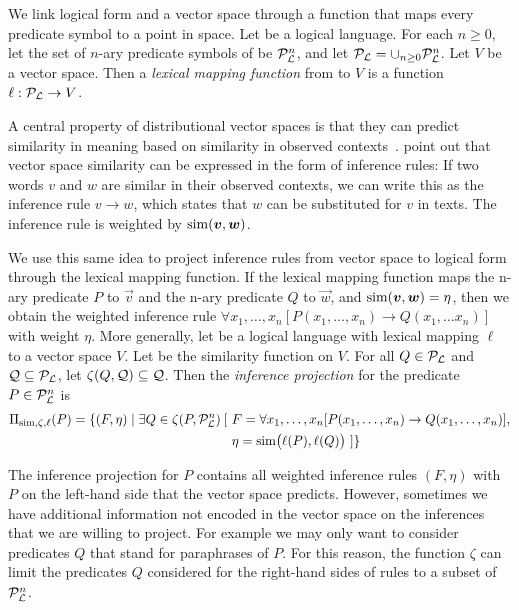 We link logical form and a vector space through a function that maps every predicate symbol to a point in
space. Let \loglang be a logical language. For each $n \ge
0$, let the set of $n$-ary predicate symbols of \loglang be
${\cal{P}}_{{\cal{L}}}^n$, and let ${\cal{P}}_{{\cal{L}}} = \cup_{n \ge 0}
{\cal{P}}_{{\cal{L}}}^n$. Let $V$ be a vector space. Then a \emph{lexical
  mapping function}
from \loglang to $V$ is a function $\ell:
{\cal{P}}_{{\cal{L}}} \to V$.

A central property
of distributional vector spaces is that they can predict similarity in
meaning based on similarity in observed
contexts~\citep{Harris}. \citet{LinPantel:01} point out that
vector space similarity can be expressed in the form of 
inference rules: If two words $v$
and $w$ are similar in their observed contexts, we can write this as
the inference rule $v \to w$, which states that $w$ can be substituted
for $v$ in texts. The inference rule is weighted by $\simfunc(\vec v, \vec w)$. 

We use this same idea to project inference rules from vector space to
logical form through the lexical mapping function. If the lexical mapping
function maps the n-ary predicate $P$ to $\vec
v$ and the n-ary predicate $Q$ to $ \vec w$, and $\simfunc(\vec v, \vec w) = \eta$, then
we obtain the weighted inference rule $\forall x_1,
\ldots, x_n[ P(x_1, \ldots, x_n) \to Q(x_1, \ldots x_n) ]$ with weight
$\eta$. More generally, let \loglang
be a logical language with lexical mapping $\ell$ to a vector space 
$V$. Let \simfunc{} be the similarity function on $V$. For all $Q \in
{\cal{P}}_{{\cal{L}}}$ and ${\cal Q} \subseteq {\cal{P}}_{{\cal{L}}}$, let
$\zeta(Q, {\cal Q}) \subseteq {\cal Q}$. Then the \emph{inference
  projection} for the predicate $P \in {\cal{P}}_{{\cal{L}}}^n$ is 
\begin{align*}
\Pi_{\mathrm{sim}, \zeta, \ell}(P) = \{ (F, \eta) \mid \exists Q \in \zeta(P, {\cal{P}}_{{\cal{L}}}^n)\:[ 
&~F = \forall x_1, \ldots, x_n[P(x_1, \ldots, x_n) \to Q(x_1, \ldots, x_n)], \\
&~\eta = \mathrm{sim}\big(\ell(P), \ell(Q)\big) ~] \}
\end{align*}

The inference projection for $P$ contains all weighted inference rules
$(F, \eta)$ with $P$ on the left-hand side that the vector space
predicts. However, sometimes we have additional information not
encoded in the vector space on the inferences that we are
willing to project. For example we may only want to consider
predicates $Q$ that stand for paraphrases of $P$. For this reason, the
function $\zeta$ can limit the predicates $Q$ considered for the right-hand
sides of rules to a subset of ${\cal{P}}_{{\cal{L}}}^n$. 



